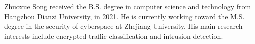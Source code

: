 % 



\newpage



\begin{IEEEbiography}
{Zhuoxue Song} received the B.S. degree in computer science and technology from Hangzhou Dianzi University, in 2021. 
He is currently working toward the M.S. degree in the security of cyberspace at Zhejiang University. 
His main research interests include encrypted traffic classification and intrusion detection.
\end{IEEEbiography}

